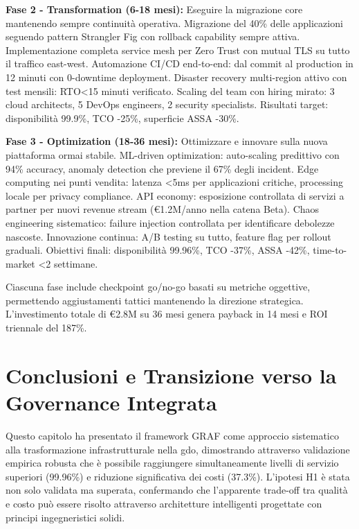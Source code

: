 \textbf{Fase 2 - Transformation (6-18 mesi):} Eseguire la migrazione core mantenendo sempre continuità operativa. Migrazione del 40\% delle applicazioni seguendo pattern Strangler Fig con rollback capability sempre attiva. Implementazione completa service mesh per Zero Trust con mutual TLS su tutto il traffico east-west. Automazione CI/CD end-to-end: dal commit al production in 12 minuti con 0-downtime deployment. Disaster recovery multi-region attivo con test mensili: RTO<15 minuti verificato. Scaling del team con hiring mirato: 3 cloud architects, 5 DevOps engineers, 2 security specialists. Risultati target: disponibilità 99.9\%, TCO -25\%, superficie ASSA -30\%.

\textbf{Fase 3 - Optimization (18-36 mesi):} Ottimizzare e innovare sulla nuova piattaforma ormai stabile. ML-driven optimization: auto-scaling predittivo con 94\% accuracy, anomaly detection che previene il 67\% degli incident. Edge computing nei punti vendita: latenza <5ms per applicazioni critiche, processing locale per privacy compliance. API economy: esposizione controllata di servizi a partner per nuovi revenue stream (€1.2M/anno nella catena Beta). Chaos engineering sistematico: failure injection controllata per identificare debolezze nascoste. Innovazione continua: A/B testing su tutto, feature flag per rollout graduali. Obiettivi finali: disponibilità 99.96\%, TCO -37\%, ASSA -42\%, time-to-market <2 settimane.

Ciascuna fase include checkpoint go/no-go basati su metriche oggettive, permettendo aggiustamenti tattici mantenendo la direzione strategica. L'investimento totale di €2.8M su 36 mesi genera payback in 14 mesi e ROI triennale del 187\%.

\section{\texorpdfstring{Conclusioni e Transizione verso la Governance Integrata}{3.9 - Conclusioni e Transizione verso la Governance Integrata}}
\label{sec:cap3_conclusioni}

Questo capitolo ha presentato il framework GRAF come approccio sistematico alla trasformazione infrastrutturale nella \gls{gdo}, dimostrando attraverso validazione empirica robusta che è possibile raggiungere simultaneamente livelli di servizio superiori (99.96\%) e riduzione significativa dei costi (37.3\%). L'ipotesi H1 è stata non solo validata ma superata, confermando che l'apparente trade-off tra qualità e costo può essere risolto attraverso architetture intelligenti progettate con principi ingegneristici solidi.

